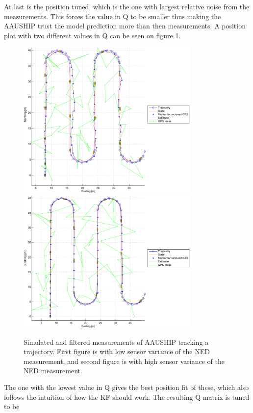 At last is the position tuned, which is the one with largest relative noise from the measurements. This forces the value in Q to be smaller thus making the AAUSHIP trust the model prediction more than then measurements. A position plot with two different values in Q can be seen on figure \ref{fig:postest0,00001}.
\begin{figure}
\centering
  \includegraphics[width=0.8\textwidth]{../../code/matlab/q0,001}
  \includegraphics[width=0.8\textwidth]{../../code/matlab/q0,00001}
  \caption{Simulated and filtered measurements of AAUSHIP tracking a trajectory. First figure is with low sensor variance of the NED measurement, and second figure is with high sensor variance of the NED measurement.}
  \label{fig:postest0,00001}
\end{figure}
The one with the lowest value in Q gives the best position fit of these, which also follows the intuition of how the \ac{KF} should work. The resulting Q matrix is tuned to be
